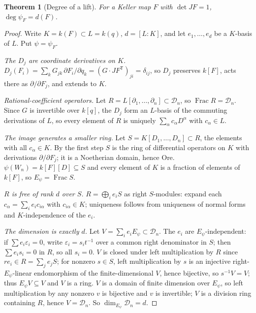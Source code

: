 \documentclass[11pt]{article}
\theoremstyle{change}
\newtheorem{theorem}[equation]{Theorem}
\theoremstyle{nonumberplain}
\newtheorem{proof}{Proof}
\newcommand\cD{{\mathcal D}}
\DeclareMathOperator{\Frac}{Frac}
\begin{document}
\begin{theorem}[Degree of a lift\label{degthm}]
For a Keller map $F$ with $\det JF = 1$, $\deg \psi_F = d(F)$.
\end{theorem}

\begin{proof}
Write $K = k(F) \subset L = k(q)$, $d = [L:K]$, and let $e_1, \dots, e_d$ be a $K$-basis of $L$. Put $\psi = \psi_F$.

\emph{The $D_j$ are coordinate derivatives on $K$.} $D_j(F_i) = \sum_k G_{jk}\, \partial F_i/\partial q_k = (G \cdot JF^{\mathsf T})_{ji} = \delta_{ij}$, so $D_j$ preserves $k[F]$, acts there as $\partial/\partial F_j$, and extends to $K$.

\emph{Rational-coefficient operators.} Let $R = L[\partial_1, \dots, \partial_n] \subset \cD_n$, so $\Frac R = \cD_n$. Since $G$ is invertible over $k[q]$, the $D_j$ form an $L$-basis of the commuting derivations of $L$, so every element of $R$ is uniquely $\sum_\alpha c_\alpha D^\alpha$ with $c_\alpha \in L$.

\emph{The image generates a smaller ring.} Let $S = K[D_1, \dots, D_n] \subset R$, the elements with all $c_\alpha \in K$. By the first step $S$ is the ring of differential operators on $K$ with derivations $\partial/\partial F_j$; it is a Noetherian domain, hence Ore. $\psi(W_n) = k[F][D] \subseteq S$ and every element of $K$ is a fraction of elements of $k[F]$, so $E_\psi = \Frac S$.

\emph{$R$ is free of rank $d$ over $S$.} $R = \bigoplus_i e_i S$ as right $S$-modules: expand each $c_\alpha = \sum_i e_i c_{i\alpha}$ with $c_{i\alpha} \in K$; uniqueness follows from uniqueness of normal forms and $K$-independence of the $e_i$.

\emph{The dimension is exactly $d$.} Let $V = \sum_i e_i E_\psi \subset \cD_n$. The $e_i$ are $E_\psi$-independent: if $\sum e_i \varepsilon_i = 0$, write $\varepsilon_i = s_i t^{-1}$ over a common right denominator in $S$; then $\sum e_i s_i = 0$ in $R$, so all $s_i = 0$. $V$ is closed under left multiplication by $R$ since $r e_i \in R = \sum_j e_j S$; for nonzero $s \in S$, left multiplication by $s$ is an injective right-$E_\psi$-linear endomorphism of the finite-dimensional $V$, hence bijective, so $s^{-1} V = V$; thus $E_\psi V \subseteq V$ and $V$ is a ring. $V$ is a domain of finite dimension over $E_\psi$, so left multiplication by any nonzero $v$ is bijective and $v$ is invertible; $V$ is a division ring containing $R$, hence $V = \cD_n$. So $\dim_{E_\psi} \cD_n = d$.
\end{proof}
\end{document}
